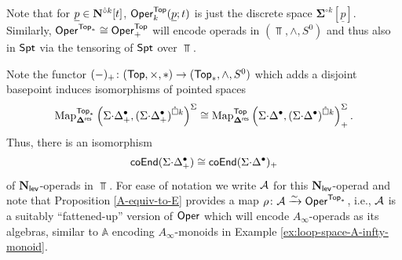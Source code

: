Note that for $\underline{p}\in \mathbf{N}^{\hat{\circ}k}[t]$, $\mathsf{Oper}^{\mathsf{Top}}_{k}(\underline{p};t)$ is just the discrete space $\mathbf{\Sigma}^{\circ k}[\underline{p}]$. Similarly, $\mathsf{Oper}^{\mathsf{Top}_*}\cong \mathsf{Oper}^{\mathsf{Top}}_+$ will encode operads in $(\Top, \wedge, S^0)$ and thus also in $\mathsf{Spt}$ via the tensoring of $\mathsf{Spt}$ over $\Top$. 

\begin{remark} \label{rem:rho}Note the functor $(-)_+ \colon (\mathsf{Top}, \times, *) \to (\mathsf{Top}_*, \wedge, S^0)$ which adds a disjoint basepoint induces isomorphisms of pointed spaces \[ \operatorname{Map}_{\mathbf{\Delta}^{\mathsf{res}}}^{\mathsf{Top}_*}  \left( \Sigma{\cdot}\Delta^{\bullet}_+, (\Sigma{\cdot}\Delta^{\bullet}_+)^{\mathring{\square} k} \right)^{\Sigma}\cong \operatorname{Map}_{\mathbf{\Delta}^{\mathsf{res}}}^{\mathsf{Top}} \left( \Sigma{\cdot}\Delta^{\bullet}, (\Sigma{\cdot}\Delta^{\bullet})^{\mathring{\square} k} \right)^{\Sigma}_+. \]
Thus, there is an isomorphism \[\mathsf{coEnd}(\Sigma{\cdot}\Delta^{\bullet}_+)\cong \mathsf{coEnd}(\Sigma{\cdot}\Delta^{\bullet})_+\] of $\mathbf{N}_{\mathsf{lev}}$-operads in $\Top$. For ease of notation we write $\mathcal{A}$ for this $\mathbf{N}_{\mathsf{lev}}$-operad and note that Proposition \ref{A-equiv-to-E} provides a map $\rho\colon \mathcal{A}\xrightarrow{\sim} \mathsf{Oper}^{\mathsf{Top}_*}$, i.e., $\mathcal{A}$ is a suitably ``fattened-up'' version of $\mathsf{Oper}$ which will encode $A_{\infty}$-operads as its algebras, similar to $\mathbb{A}$ encoding $A_{\infty}$-monoids in Example \ref{ex:loop-space-A-infty-monoid}. 
\end{remark}
